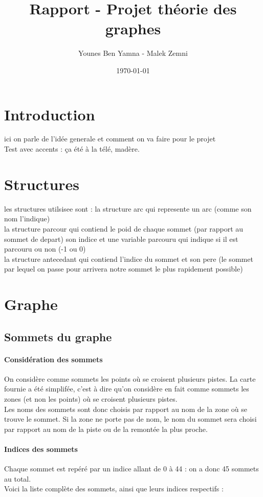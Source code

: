 \documentclass[a4]{article}
\author{Younes Ben Yamna - Malek Zemni}
\title{Rapport - Projet théorie des graphes}
\date{\today}
\begin{document}
\maketitle

	\section{Introduction}
			ici on parle de l'idée generale et comment on va faire pour le projet\\
			Test avec accents : ça été à la télé, madère.
	\section{Structures}
			les structures utilsisee sont :
			la structure arc qui represente un arc (comme son nom l'indique)\\
			la structure parcour qui contiend le poid de chaque sommet (par rapport au sommet de depart)
			son indice et une variable parcouru qui indique si il est parcouru ou non (-1 ou 0)\\
			la structure antecedant qui contiend l'indice du sommet et son pere (le sommet par lequel on passe pour arrivera notre sommet le plus rapidement possible)
			
	\section{Graphe}
		\subsection{Sommets du graphe}
			\paragraph{Considération des sommets\\}
			On considère comme sommets les points où se croisent plusieurs pistes. La carte fournie a été simplifée, c'est à dire qu'on
			considère en fait comme sommets les zones (et non les points) où se croisent plusieurs pistes.\\
			Les noms des sommets sont donc choisis par rapport au nom de la zone où se trouve le sommet. 
			Si la zone ne porte pas de nom, le nom du sommet sera choisi par rapport au nom de la piste ou de la remontée la plus proche.
			\paragraph{Indices des sommets\\}
			Chaque sommet est repéré par un indice allant de 0 à 44 : on a donc 45 sommets au total.\\
			Voici la liste complète des sommets, ainsi que leurs indices respectifs :
			
\end{document}
